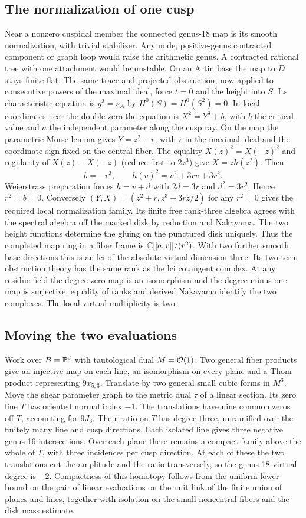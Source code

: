 \subsection{The normalization of one cusp}
Near a nonzero cuspidal member the connected genus-18 map is its
smooth normalization, with trivial stabilizer. Any node, positive-genus
contracted component or graph loop would raise the arithmetic genus.
A contracted rational tree with one attachment would be unstable.
On an Artin base the map to $D$ stays finite flat. The same trace
and projected obstruction, now applied to consecutive powers of the
maximal ideal, force $t=0$ and the height into $S$. Its characteristic
equation is $y^3=s_A$ by $H^0(S)=H^0(S^2)=0$.
In local coordinates near the double zero the equation is
$X^2=Y^3+b$, with $b$ the critical value and $a$ the independent
parameter along the cusp ray. On the map the parametric Morse lemma
gives $Y=z^2+r$, with $r$ in the maximal ideal and the coordinate
sign fixed on the central fiber. The equality $X(z)^2=X(-z)^2$ and
regularity of $X(z)-X(-z)$ (reduce first to $2z^3$) give
$X=z h(z^2)$. Then
\[
 b=-r^3,\qquad h(v)^2=v^2+3rv+3r^2 .
\]
Weierstrass preparation forces $h=v+d$ with $2d=3r$ and $d^2=3r^2$.
Hence $r^2=b=0$. Conversely $(Y,X)=(z^2+r,z^3+3rz/2)$ for any
$r^2=0$ gives the required local normalization family. Its finite
free rank-three algebra agrees with the spectral algebra off the
marked disk by reduction and Nakayama. The two height functions
determine the gluing on the punctured disk uniquely. Thus the completed
map ring in a fiber frame is $\mathbb C[[a,r]]/(r^2)$.
With two further smooth base directions this is an lci of the absolute
virtual dimension three. Its two-term obstruction theory has the same
rank as the lci cotangent complex. At any residue field the degree-zero
map is an isomorphism and the degree-minus-one map is surjective;
equality of ranks and derived Nakayama identify the two complexes.
The local virtual multiplicity is two.

\subsection{Moving the two evaluations}
Work over $B=\mathbb P^2$ with tautological dual $M=\mathcal O(1)$. Two general
fiber products give an injective map on each line, an isomorphism on
every plane and a Thom product representing $9x_{5,3}$. Translate by
two general small cubic forms in $M^3$. Move the shear parameter
graph to the metric dual $\tau$ of a linear section. Its zero line
$T$ has oriented normal index $-1$. The translations have nine common
zeros off $T$, accounting for $9J_3$. Their ratio on $T$ has degree
three, unramified over the finitely many line and cusp directions.
Each isolated line gives three negative genus-16 intersections.
Over each plane there remains a compact family above the whole of
$T$, with three incidences per cusp direction. At each of these the
two translations cut the amplitude and the ratio transversely, so the
genus-18 virtual degree is $-2$. Compactness of this homotopy follows
from the uniform lower bound on the pair of linear evaluations on
the unit link of the finite union of planes and lines, together with
isolation on the small noncentral fibers and the disk mass estimate.

